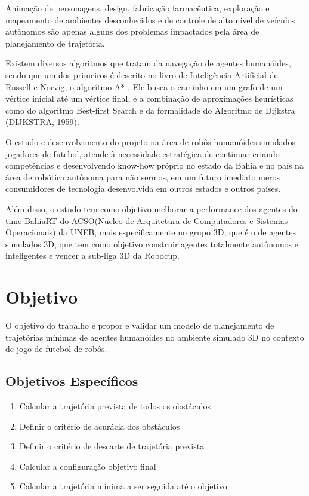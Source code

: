 \documentclass[font=plain]{abnt}
\begin{document}
Animação de personagens, design, fabricação farmacêutica, exploração e mapeamento de ambientes desconhecidos e de controle de
alto nível de veículos autônomos são apenas alguns dos problemas impactados pela área de planejamento de trajetória.

Existem diversos algoritmos que tratam da navegação de agentes humanóides, sendo que um dos primeiros é descrito no livro de
Inteligência Artificial de Russell e Norvig, o algorítmo A* \cite{brussel}. Ele busca o caminho em um grafo de
um vértice inicial até um vértice final, é a combinação de aproximações heurísticas como do algoritmo Best-first Search e da
formalidade do Algoritmo de Dijkstra (DIJKSTRA, 1959).

O estudo e desenvolvimento do projeto na área de robôs humanóides simulados jogadores de futebol, atende à necessidade estratégica
de continuar criando competências e desenvolvendo know-how próprio no estado da Bahia e no país na área de robótica autônoma para
não sermos, em um futuro imediato meros consumidores de tecnologia desenvolvida em outros estados e outros países.

Além disso, o estudo tem como objetivo melhorar a performance dos agentes do time BahiaRT do ACSO(Nucleo de Arquitetura de 
Computadores e Sistemas Operacionais) da UNEB, mais especificamente no grupo 3D, que é o de agentes simulados 3D, que tem como objetivo
construir agentes totalmente autônomos e inteligentes e vencer a sub-liga 3D da Robocup.

\chapter{Objetivo}
O objetivo do trabalho é propor e validar um modelo de planejamento de trajetórias mínimas de agentes humanóides no ambiente simulado 
3D no contexto de jogo de futebol de robôs.

\section{Objetivos Específicos}
\begin{enumerate}
\item Calcular a trajetória prevista de todos os obstáculos
\item Definir o critério de acurácia dos obstáculos %
\item Definir o critério de descarte de trajetória prevista
\item Calcular a configuração objetivo final
\item Calcular a trajetória mínima a ser seguida até o objetivo
\end{enumerate}
\end{document}
